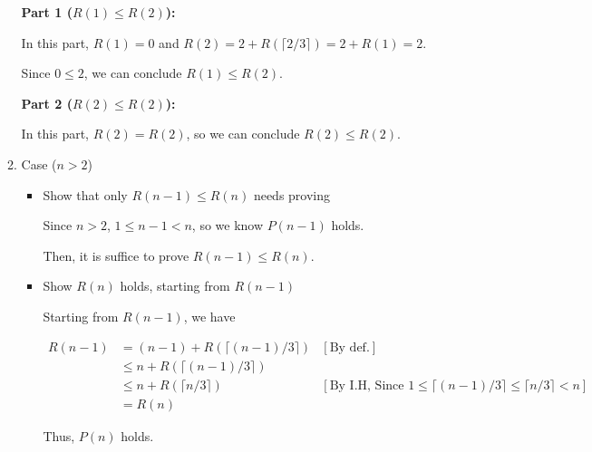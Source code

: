 \documentclass[12pt]{article}
\begin{document}
\begin{enumerate}[a.]
\begin{mdframed}
\begin{enumerate}[1.]
\begin{mdframed}
        \bigskip

        \textbf{Part 1 ($R(1) \leq R(2)$):}

        \bigskip

        In this part, $R(1) = 0$ and $R(2) = 2 + R(\lceil 2/3 \rceil) = 2 + R(1) = 2$.

        \bigskip

        Since $0 \leq 2$, we can conclude $R(1) \leq R(2)$.

        \bigskip

        \textbf{Part 2 ($R(2) \leq R(2)$):}

        \bigskip

        In this part, $R(2) = R(2)$, so we can conclude $R(2) \leq R(2)$.

        \end{mdframed}

        \item Case ($n > 2$)

        \begin{itemize}
            \item Show that only $R(n-1) \leq R(n)$ needs proving

            \begin{mdframed}
            Since $n > 2$, $1 \leq n - 1 < n$, so we know $P(n-1)$ holds.

            \bigskip

            Then, it is suffice to prove $R(n-1) \leq R(n)$.

            \end{mdframed}

            \item Show $R(n)$ holds, starting from $R(n-1)$

            \begin{mdframed}
            Starting from $R(n-1)$, we have

            \begin{align}
                R(n-1) &= (n-1) + R(\lceil (n-1)/3 \rceil) & [\text{By def.}]\\
                &\leq n + R(\lceil (n-1)/3 \rceil) \\
                &\leq n + R(\lceil n/3 \rceil) & [\text{By I.H, Since $1 \leq \lceil (n-1)/3 \rceil \leq \lceil n/3 \rceil < n$}]\\
                &= R(n)
            \end{align}

            \bigskip

            Thus, $P(n)$ holds.
            \end{mdframed}
        \end{itemize}

    \end{enumerate}

    \end{mdframed}

\end{enumerate}
\end{document}
